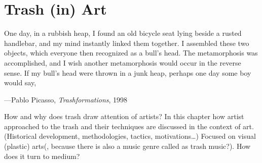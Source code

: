\chapter{Trash (in) Art}





\epigraph{One day, in a rubbish heap, I found an old bicycle seat lying beside a rusted handlebar, and my mind instantly linked them together. I assembled these two objects, which everyone then recognized as a bull’s head. The metamorphosis was accomplished, and I wish another metamorphosis would occur in the reverse sense. If my bull’s head were thrown in a junk heap, perhaps one day some boy would say, }{\hfill ---Pablo Picasso, \textit{Trashformations}, 1998}






How and why does trash draw attention of artists? In this chapter how artist approached to the trash and their techniques are discussed in the context of art. (Historical development, methodologies, tactics, motivations\ldots) Focused on visual (plastic) arts(, because there is also a music genre called as trash music?). How does it turn to medium?






%
%
